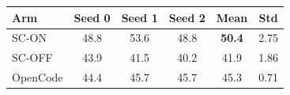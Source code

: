 \begin{tabular}{lccccc}
\toprule
Arm      & Seed 0 & Seed 1 & Seed 2 & Mean & Std \\
\midrule
SC-ON    & 48.8 & 53.6 & 48.8 & \textbf{50.4} & 2.75 \\
SC-OFF   & 43.9 & 41.5 & 40.2 & 41.9          & 1.86 \\
OpenCode & 44.4 & 45.7 & 45.7 & 45.3          & 0.71 \\
\bottomrule
\end{tabular}
